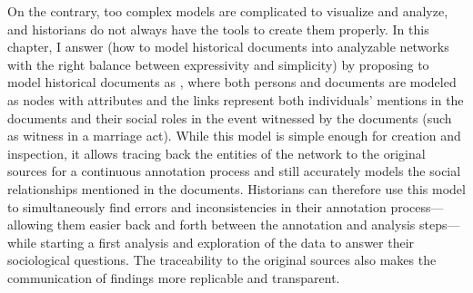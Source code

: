 On the contrary, too complex models are complicated to visualize and analyze, and historians do not always have the tools to create them properly.
In this chapter, I answer \qone (how to model historical documents into analyzable networks with the right balance between expressivity and simplicity) by proposing to model historical documents as \modelplural, where both persons and documents are modeled as nodes with attributes and the links represent both individuals' mentions in the documents and their social roles in the event witnessed by the documents (such as witness in a marriage act).
While this model is simple enough for creation and inspection, it allows tracing back the entities of the network to the original sources for a continuous annotation process and still accurately models the social relationships mentioned in the documents.
Historians can therefore use this model to simultaneously find errors and inconsistencies in their annotation process---allowing them easier back and forth between the annotation and analysis steps---while starting a first analysis and exploration of the data to answer their sociological questions.
The traceability to the original sources also makes the communication of findings more replicable and transparent.

